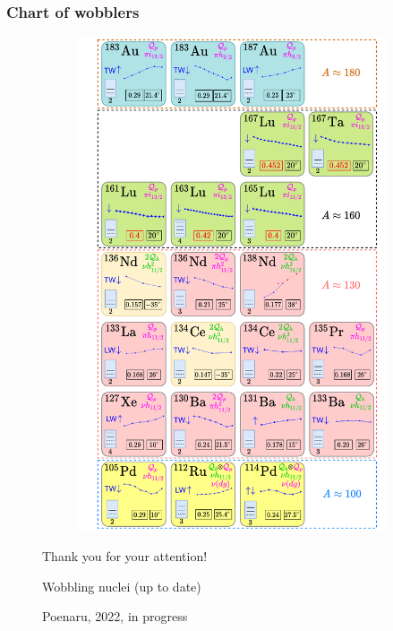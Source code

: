 \documentclass{beamer}
\begin{document}
\begin{frame}
  \frametitle{Chart of wobblers}
  \begin{figure}
    \centering
    \begin{minipage}{.5\textwidth}
      \begin{figure}
        \centering
        \includegraphics[scale=0.22]{Figs/wobblers-chart.pdf}
      \end{figure}
    \end{minipage}%
    \begin{minipage}{.5\textwidth}
      \par{\large{Thank you for your attention!}}
      \vspace*{3cm}
      \par{\tiny{Wobbling nuclei (up to date)}}
      \par{\tiny{Poenaru, 2022, in progress}}
    \end{minipage}
    \end{figure}
\end{frame}

\end{document}
